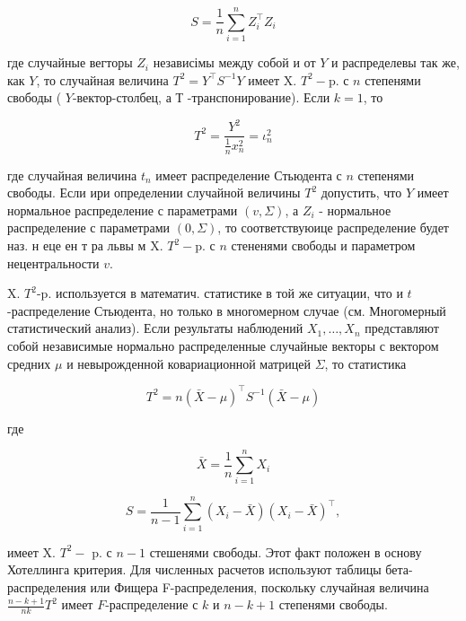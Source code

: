 \documentclass[10pt]{article}
\begin{document}
\[

S=\frac{1}{n} \sum_{i=1}^{n} Z_{i}^{\top} Z_{i}

\]



где случайные вегторы $Z_{i}$ независімы между собой и от $Y$ и распределевы так же, как $Y$, то случайная величина $T^{2}=Y^{\top} S^{-1} Y$ имеет $\mathrm{X}$. $T^{2}-\mathrm{p}$. с $n$ степенями свободы ( $Y$-вектор-столбец, а Т -транспонирование). Если $k=1$, то



\[

T^{2}=\frac{Y^{2}}{\frac{1}{n} x_{n}^{2}}=\iota_{n}^{2}

\]



где случайная величина $t_{n}$ имеет распределение Стьюдента с $n$ степенями свободы. Если ири определении случайной величины $T^{2}$ допустить, что $Y$ имеет нормальное распределение с параметрами $(v, \Sigma)$, а $Z_{i}$ - нормальное распределение с параметрами $(0, \Sigma)$, то соответствуюице распределение будет наз. н еце ен т ра львы м $\mathrm{X}$. $T^{2}-\mathrm{p}$. с $n$ стененями свободы и параметром нецентральности $v$.



X. $T^{2}$-p. используется в математич. статистике в той же ситуации, что и $t$-распределение Стьюдента, но только в многомерном случае (см. Многомерный статистический анализ). Если результаты наблюдений $X_{1}, \ldots, X_{n}$ представляют собой независимые нормально распределенные случайные векторы с вектором средних $\mu$ и невырожденной ковариационной матрицей $\Sigma$, то статистика



\[

T^{2}=n(\bar{X}-\mu)^{\top} S^{-1}(\bar{X}-\mu)

\]



где



\[

\bar{X}=\frac{1}{n} \sum_{i=1}^{n} X_{i}

\]



\[

S=\frac{1}{n-1} \sum_{i=1}^{n}\left(X_{i}-\bar{X}\right)\left(X_{i}-\bar{X}\right)^{\top},

\]



имеет X. $T^{2}-$ p. с $n-1$ стешенями свободы. Этот факт положен в основу Хотеллинга критерия. Для численных расчетов используют таблицы бета-распределения или Фищера F-распределения, поскольку случайная величина $\frac{n-k+1}{n k} T^{2}$ имеет $F$-распределение с $k$ и $n-k+1$ степенями свободы.
\end{document}
